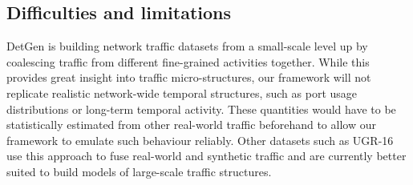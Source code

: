 \documentclass[conference]{IEEEtran}
\begin{document}






\subsection{Difficulties and limitations}

DetGen is building network traffic datasets from a small-scale level up by coalescing traffic from different fine-grained activities together. While this provides great insight into traffic micro-structures, our framework will not replicate realistic network-wide temporal structures, such as port usage distributions or long-term temporal activity. These quantities would have to be statistically estimated from other real-world traffic beforehand to allow our framework to emulate such behaviour reliably. Other datasets such as UGR-16 use this approach to fuse real-world and synthetic traffic and are currently better suited to build models of large-scale traffic structures.
\end{document}
